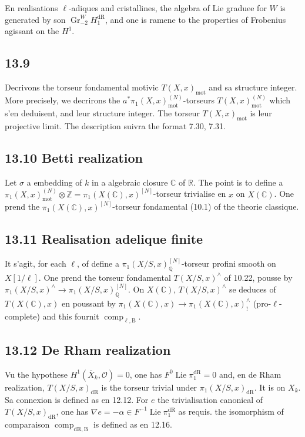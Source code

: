 \documentclass[12pt,a4paper]{article}
\theoremstyle{plain}
\theoremstyle{definition}
\theoremstyle{remark}
\DeclareMathOperator{\Gr}{Gr}
\DeclareMathOperator{\Lie}{Lie}
\DeclareMathOperator{\comp}{comp}
\newcommand{\cO}{\mathcal{O}}
\newcommand{\bZ}{\mathbb{Z}}
\newcommand{\bQ}{\mathbb{Q}}
\newcommand{\bR}{\mathbb{R}}
\newcommand{\bC}{\mathbb{C}}
\newcommand{\dr}{\mathrm{dR}}
\newcommand{\B}{\mathrm{B}}
\newcommand{\mot}{\mathrm{mot}}
\begin{document}
En realisations $\ell$-adiques and cristallines, the algebra of Lie graduee for $W$ is generated by son $\Gr_{-2}^W H_1^{\dr}$, and one is ramene to the properties of Frobenius agissant on the $H^1$.

\subsection*{13.9}

Decrivons the torseur fondamental motivic $T(X,x)_{\mot}$ and sa structure integer. More precisely, we decrirons the $a^*\pi_1(X,x)_{\mot}^{(N)}$-torseurs $T(X,x)_{\mot}^{(N)}$ which s'en deduisent, and leur structure integer. The torseur $T(X,x)_{\mot}$ is leur projective limit. The description suivra the format 7.30, 7.31.

\subsection*{13.10 Betti realization}

Let $\sigma$ a embedding of $k$ in a algebraic closure $\bC$ of $\bR$. The point is to define a $\pi_1(X,x)_{\mot}^{(N)} \otimes \bZ = \pi_1(X(\bC),x)^{[N]}$-torseur trivialise en $x$ on $X(\bC)$. One prend the $\pi_1(X(\bC), x)^{[N]}$-torseur fondamental (10.1) of the theorie classique.

\subsection*{13.11 Realisation adelique finite}

It s'agit, for each $\ell$, of define a $\pi_1(X/S, x)_{\bQ}^{[N]}$-torseur profini smooth on $X[1/\ell]$. One prend the torseur fondamental $T(X/S, x)^\wedge$ of 10.22, pousse by $\pi_1(X/S, x)^\wedge \to \pi_1(X/S, x)_{\bQ}^{[N]}$. On $X(\bC)$, $T(X/S, x)^\wedge$ se deduces of $T(X(\bC), x)$ en poussant by $\pi_1(X(\bC), x) \to \pi_1(X(\bC), x)_{!}^\wedge$ (pro-$\ell$-complete) and this fournit $\comp_{\ell,\B}$.

\subsection*{13.12 De Rham realization}

Vu the hypothese $H^1(\overline{X}_k, \cO) = 0$, one has $F^0 \Lie \pi_1^{\dr} = 0$ and, en de Rham realization, $T(X/S, x)_{\dr}$ is the torseur trivial under $\pi_1(X/S, x)_{\dr}$. It is on $X_k$. Sa connexion is defined as en 12.12. For $e$ the trivialisation canonical of $T(X/S, x)_{\dr}$, one has $\nabla e = -\alpha \in F^{-1} \Lie \pi_1^{\dr}$ as requis. the isomorphism of comparaison $\comp_{\dr,\B}$ is defined as en 12.16.
\end{document}
